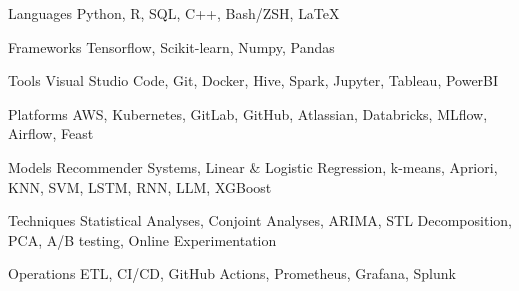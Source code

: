 

\begin{cvskills}

  \cvskill
    {Languages} %
    {Python, R, SQL, C++, Bash/ZSH, {\LaTeX{}}} %

  \cvskill
    {Frameworks} %
    {Tensorflow, Scikit-learn, Numpy, Pandas} %

  \cvskill
    {Tools} %
    {Visual Studio Code, Git, Docker,  Hive, Spark, Jupyter, Tableau, PowerBI} %

  \cvskill
    {Platforms} %
    {AWS, Kubernetes, GitLab, GitHub, Atlassian, Databricks, MLflow, Airflow, Feast} %

  \cvskill
    {Models} %
    {Recommender Systems, Linear \& Logistic Regression, k-means, Apriori, KNN, SVM, LSTM, RNN, LLM, XGBoost} %

  \cvskill
    {Techniques} %
    {Statistical Analyses, Conjoint Analyses, ARIMA, STL Decomposition, PCA, A/B testing, Online Experimentation} %

  \cvskill
    {Operations} %
    {ETL, CI/CD, GitHub Actions, Prometheus, Grafana, Splunk} %

\end{cvskills}

